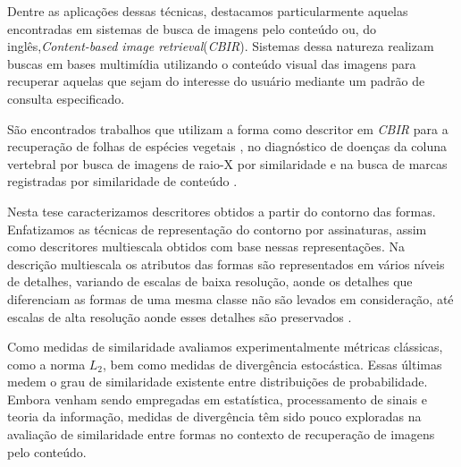 Dentre as aplicações dessas técnicas, destacamos particularmente aquelas encontradas em sistemas de busca de imagens pelo conteúdo ou, do inglês,\foreignlanguage{english}{\emph{Content-based image retrieval}}(\emph{CBIR}). Sistemas dessa natureza realizam buscas em bases multimídia utilizando o conteúdo visual das imagens para recuperar aquelas que sejam do interesse do usuário mediante um padrão de consulta especificado. 

São encontrados trabalhos que utilizam a forma como descritor em \emph{CBIR} para a recuperação de folhas de espécies vegetais \cite{Fotopoulou:2013, Nam2008245, Wang:2000}, no diagnóstico de doenças da coluna vertebral por busca de imagens de raio-X por similaridade \cite{Lee20091359} e na busca de marcas registradas por similaridade de conteúdo \cite{MohdAnuar2013105,Qi20102017}.

\begin{comment}
A demanda por novas maneiras de gerenciar e buscar informação multimidia surgiu com a popularização da internet, com a maior disponibilidade de dispositivos de captura de imagens e com a diminuição dos custos dos meios de armazenamento; aspectos esses que contribuíram para um volume crescente de imagens digitais disponibilizadas para as mais diversas finalidades.

Neste contexto, uma nova linha de pesquisa de sistemas de busca de informação desponta, denominada de recuperação de imagens pelo conteúdo ou, do inglês, \foreignlanguage{english}{\emph{Content-Based Image Retrieval}} (\emph{CBIR}). 
\end{comment}


Nesta tese caracterizamos descritores obtidos a partir do contorno das formas.  Enfatizamos as técnicas de representação do contorno por assinaturas, assim como descritores multiescala obtidos com base nessas representações. Na descrição multiescala os atributos das formas são representados em vários níveis de detalhes, variando de escalas de baixa resolução, aonde os detalhes que diferenciam as formas de uma mesma classe não são levados em consideração, até escalas de alta resolução aonde esses detalhes são preservados \cite{Ullman:1996}.
 
Como medidas de similaridade avaliamos experimentalmente métricas clássicas, como a norma $L_2$, bem como medidas de divergência estocástica. Essas últimas medem o grau de similaridade existente entre distribuições de probabilidade. Embora venham sendo empregadas em estatística, processamento de sinais e teoria da informação, medidas de divergência têm sido pouco exploradas na avaliação de similaridade entre formas no contexto de recuperação de imagens pelo conteúdo.  

